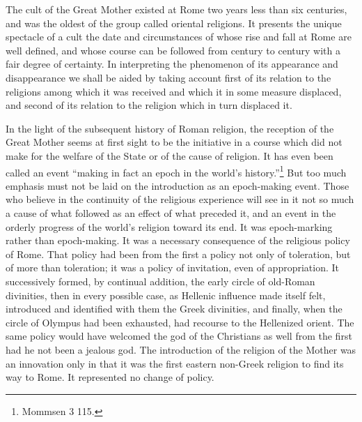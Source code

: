 \documentclass[a4paper, 11pt, oneside, polutonikogreek, english]{article}
\begin{document}
The cult of the Great Mother existed at Rome two years less than six centuries, and was the oldest of the group called oriental religions. It presents the unique spectacle of a cult the date and circumstances of whose rise and fall at Rome are well defined, and whose course can be followed from century to century with a fair degree of certainty. In interpreting the phenomenon of its appearance and disappearance we shall be aided by taking account first of its relation to the religions among which it was received and which it in some measure displaced, and second of its relation to the religion which in turn displaced it.

In the light of the subsequent history of Roman religion, the reception of the Great Mother seems at first sight to be the initiative in a course which did not make for the welfare of the State or of the cause of religion. It has even been called an event ``making in fact an epoch in the world's history.''\footnote{Mommsen 3 115.} But too much emphasis must not be laid on the introduction as an epoch-making event. Those who believe in the continuity of the religious experience will see in it not so much a cause of what followed as an effect of what preceded it, and an event in the orderly progress of the world's religion toward its end. It was epoch-marking rather than epoch-making. It was a necessary consequence of the religious policy of Rome. That policy had been from the first a policy not only of toleration, but of more than toleration; it was a policy of invitation, even of appropriation. It successively formed, by continual addition, the early circle of old-Roman divinities, then in every possible case, as Hellenic influence made itself felt, introduced and identified with them the Greek divinities, and finally, when the circle of Olympus had been exhausted, had recourse to the Hellenized orient. The same policy would have welcomed the god of the Christians as well from the first had he not been a jealous god. The introduction of the religion of the Mother was an innovation only in that it was the first eastern non-Greek religion to find its way to Rome. It represented no change of policy.
\end{document}

